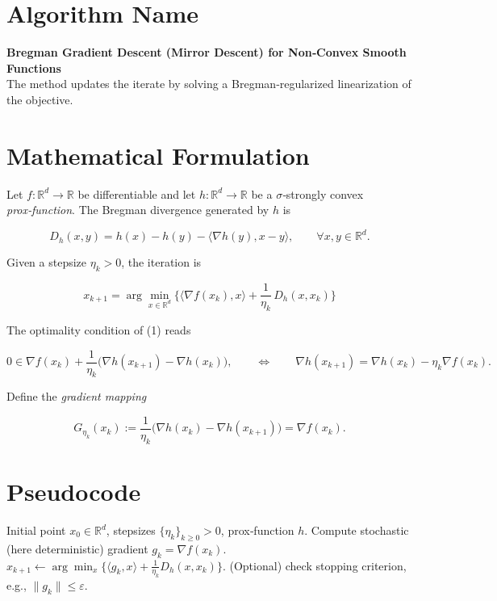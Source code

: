 \documentclass{article}
\newcommand{\D}[2]{D_{h}(#1,#2)}
\newcommand{\grad}{\nabla}
\newcommand{\inner}[2]{\langle #1,#2\rangle}
\newcommand{\norm}[1]{\|#1\|}
\begin{document}
\section*{Algorithm Name}
\textbf{Bregman Gradient Descent (Mirror Descent) for Non‑Convex Smooth Functions}\\
The method updates the iterate by solving a Bregman‑regularized linearization of the objective.

\section*{Mathematical Formulation}
Let $f:\mathbb{R}^{d}\rightarrow\mathbb{R}$ be differentiable and let $h:\mathbb{R}^{d}\rightarrow\mathbb{R}$ be a $\sigma$‑strongly convex {\it prox‑function}.  
The Bregman divergence generated by $h$ is  

\[
\D{x}{y}=h(x)-h(y)-\inner{\grad h(y)}{x-y},\qquad \forall x,y\in\mathbb{R}^{d}.
\]

Given a stepsize $\eta_k>0$, the iteration is

\[
\boxed{
x_{k+1}= \arg\min_{x\in\mathbb{R}^{d}}
\Big\{ \inner{\grad f(x_k)}{x}+ \frac{1}{\eta_k}\,\D{x}{x_k}\Big\}
}
\tag{1}
\]

The optimality condition of (1) reads  

\[
0\in \grad f(x_k)+\frac{1}{\eta_k}\big(\grad h(x_{k+1})-\grad h(x_k)\big),
\qquad\Longleftrightarrow\qquad
\grad h(x_{k+1})=\grad h(x_k)-\eta_k\grad f(x_k).
\tag{2}
\]

Define the \emph{gradient mapping}  

\[
G_{\eta_k}(x_k):=\frac{1}{\eta_k}\big(\grad h(x_k)-\grad h(x_{k+1})\big)
               =\grad f(x_k). \tag{3}
\]

\section*{Pseudocode}
\begin{algorithm}[H]
\caption{Bregman Gradient Descent}
\begin{algorithmic}[1]
\Require Initial point $x_{0}\in\mathbb{R}^{d}$, stepsizes $\{\eta_k\}_{k\ge0}>0$, prox‑function $h$.
    \State Compute stochastic (here deterministic) gradient $g_k=\grad f(x_k)$.
    \State $x_{k+1}\gets\displaystyle\arg\min_{x}\Big\{\inner{g_k}{x}+ \frac{1}{\eta_k}\D{x}{x_k}\Big\}$.
    \State (Optional) check stopping criterion, e.g., $\norm{g_k}\le\varepsilon$.
\EndFor
\end{algorithmic}
\end{algorithm}
\end{document}
